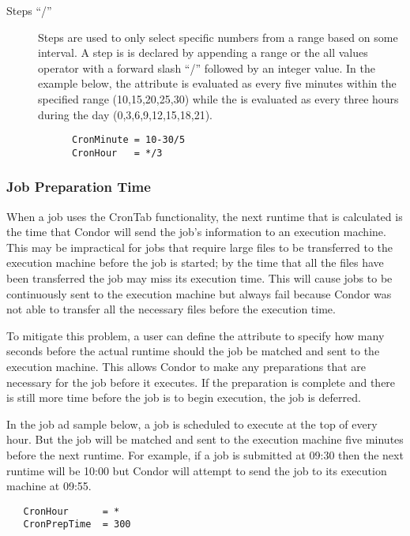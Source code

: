 \begin{description}
   \item[Steps ``/'']
   Steps are used to only select specific numbers from a range based on 
   some interval. A step is is declared by appending a range or the all
   values operator with a forward slash ``/'' followed by an integer
   value. In the example below, the 
   attribute is evaluated as every five minutes within the specified
   range (10,15,20,25,30) while the  is evaluated as 
   every three hours during the day (0,3,6,9,12,15,18,21).
   
   \begin{verbatim}
      CronMinute = 10-30/5
      CronHour   = */3
   \end{verbatim}

\end{description}

\subsubsection{Job Preparation Time}
\label{sec:crontab-preptime}
When a job uses the CronTab functionality, the next runtime that is calculated is
the time that Condor will send the job's information to an execution machine.
This may be impractical for jobs that require large files to be transferred to
the execution machine before the job is started; by the time that all the 
files have been transferred the job may miss its execution time. This will cause
jobs to be continuously sent to the execution machine but always fail because Condor was not able to transfer all the necessary files before the execution time.

To mitigate this problem, a user can define the 
attribute to specify how many seconds before the actual runtime should the
job be matched and sent to the execution machine. This allows Condor to
make any preparations that are necessary for the job before it executes. If
the preparation is complete and there is still more time before the job
is to begin execution, the job is deferred.

In the job ad sample below, a job is scheduled to execute at the top of every hour.
But the job will be matched and sent to the execution machine five minutes
before the next runtime. For example, if a job is submitted at 09:30 then the 
next runtime will be 10:00 but Condor will attempt to send the job to
its execution machine at 09:55.

\begin{verbatim}
   CronHour      = *
   CronPrepTime  = 300
\end{verbatim}


